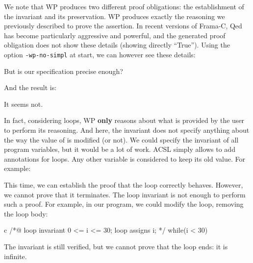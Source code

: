 

We note that WP produces two different proof obligations: the
establishment of the invariant and its preservation. WP produces exactly
the reasoning we previously described to prove the assertion. In recent
versions of Frama-C, Qed has become particularly aggressive and
powerful, and the generated proof obligation does not show these details
(showing directly ``True''). Using the option \texttt{-wp-no-simpl} at
start, we can however see these details:





But is our specification precise enough?






And the result is:





It seems not.





In fact, considering loops, WP \textbf{only} reasons about what is
provided by the user to perform its reasoning. And here, the invariant
does not specify anything about the way the value of  is
modified (or not). We could specify the invariant of all program
variables, but it would be a lot of work. ACSL simply allows to add
 annotations for loops. Any other variable is considered
to keep its old value. For example:






This time, we can establish the proof that the loop correctly behaves.
However, we cannot prove that it terminates. The loop invariant is not
enough to perform such a proof. For example, in our program, we could
modify the loop, removing the loop body:



\begin{CodeBlock}{c}
/*@
  loop invariant 0 <= i <= 30;
  loop assigns i;
*/
while(i < 30){
   
}
\end{CodeBlock}



The invariant is still verified, but we cannot prove that the loop ends:
it is infinite.



